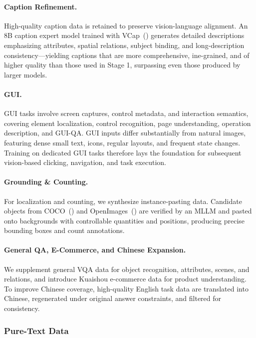 \documentclass{article} %
\begin{document}
\paragraph{Caption Refinement.}
High-quality caption data is retained to preserve vision-language alignment. An 8B caption expert model trained with VCap~(\cite{vcap}) generates detailed descriptions emphasizing attributes, spatial relations, subject binding, and long-description consistency—yielding captions that are more comprehensive, ine-grained, and of higher quality than those used in Stage 1, surpassing even those produced by larger models.

\paragraph{GUI.}
GUI tasks involve screen captures, control metadata, and interaction semantics, covering element localization, control recognition, page understanding, operation description, and GUI-QA. GUI inputs differ substantially from natural images, featuring dense small text, icons, regular layouts, and frequent state changes. Training on dedicated GUI tasks therefore lays the foundation for subsequent vision-based clicking, navigation, and task execution.


\paragraph{Grounding \& Counting.}
For localization and counting, we synthesize instance-pasting data. Candidate objects from COCO~(\cite{coco}) and OpenImages~(\cite{openimages}) are verified by an MLLM and pasted onto backgrounds with controllable quantities and positions, producing precise bounding boxes and count annotations.

\paragraph{General QA, E-Commerce, and Chinese Expansion.}
We supplement general VQA data for object recognition, attributes, scenes, and relations, and introduce Kuaishou e-commerce data for product understanding. To improve Chinese coverage, high-quality English task data are translated into Chinese, regenerated under original answer constraints, and filtered for consistency.

\subsubsection{Pure-Text Data}
\end{document}

